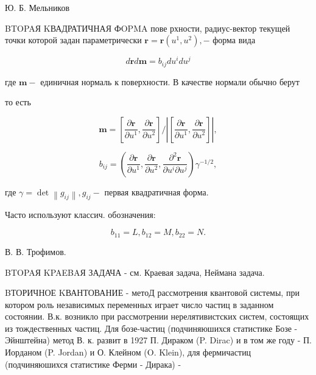\documentclass[10pt]{article}
\begin{document}
Ю. Б. Мельников



BTOPAЯ KВАДРАТИЧНАЯ ФOPMA пове рхности, радиус-вектор текущей точки которой задан параметрически $\boldsymbol{r}=\boldsymbol{r}\left(u^{1}, u^{2}\right),-$ форма вида



\[

d \boldsymbol{r} d \boldsymbol{m}=b_{i j} d u^{i} d u^{j}

\]



где $\boldsymbol{m}-$ единичная нормаль к поверхности. В качестве нормали обычно берут



то есть



\[

\boldsymbol{m}=\left[\frac{\partial \boldsymbol{r}}{\partial u^{1}}, \frac{\partial \boldsymbol{r}}{\partial u^{2}}\right] /\left|\left[\frac{\partial \boldsymbol{r}}{\partial u^{1}}, \frac{\partial \boldsymbol{r}}{\partial u^{2}}\right]\right|,

\]



\[

b_{i j}=\left(\frac{\partial \boldsymbol{r}}{\partial u^{1}}, \frac{\partial \boldsymbol{r}}{\partial u^{2}}, \frac{\partial^{2} \boldsymbol{r}}{\partial u^{i} \partial u^{j}}\right) \gamma^{-1 / 2},

\]



где $\gamma=\operatorname{det}\left\|g_{i j}\right\|, g_{i j}-$ первая квадратичная форма.



Часто используют классич. обозначения:



\[

b_{11}=L, b_{12}=M, b_{22}=N .

\]



В. В. Трофимов.



BTOPAЯ KPAEBAЯ ЗАДАЧА - см. Краевая задача, Неймана задача.



BТОРИЧНОЕ KВАНТОВАНИЕ - метоД рассмотрения квантовой системы, при котором роль независимых переменных играет число частиц в заданном состоянии. В.к. возникло при рассмотрении нерелятивистских систем, состоящих из тождественных частиц. Для бозе-частиц (подчиняюшихся статистике Бозе - Эйнштейна) метод В. к. развит в 1927 П. Дираком (P. Dirac) и в том же году - П. Иорданом (P. Jordan) и О. Клейном (O. Klein), для фермичастиц (подчиняюшихся статистике Ферми - Дирака) -
\end{document}
